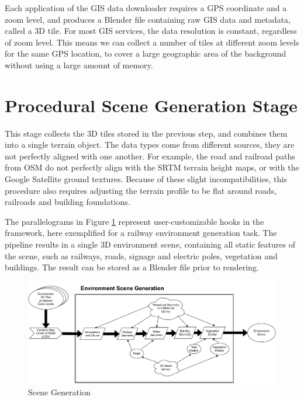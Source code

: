 Each application of the GIS data downloader requires a GPS coordinate and a zoom level, and produces a Blender file containing raw GIS data and metadata, called a 3D tile. For most GIS services, the data resolution is constant, regardless of zoom level. This means we can collect a number of tiles at different zoom levels for the same GPS location, to cover a large geographic area of the background without using a large amount of memory.


\section{Procedural Scene Generation Stage}
\label{sec:scene-generation-stage}

This stage collects the 3D tiles stored in the previous step, and combines them into a single terrain object. The data types come from different sources, they are not perfectly aligned with one another. For example, the road and railroad paths from OSM do not perfectly align with the SRTM terrain height maps, or with the Google Satellite ground textures. Because of these slight incompatibilities, this procedure also requires adjusting the terrain profile to be flat around roads, railroads and building foundations.

The parallelograms in Figure \ref{fig:design-scene-generation} represent user-customizable hooks in the framework, here exemplified for a  railway environment generation task. The pipeline results in a single 3D environment scene, containing all static features of the scene, such as railways, roads, signage and electric poles, vegetation and buildings. The result can be stored as a Blender file prior to rendering.

\begin{figure}[H]
    \centering
    \includegraphics[width=14.5cm]{src/img/fig/fig-3 environment scene generation.drawio.pdf}
    \caption{Scene Generation}
    \label{fig:design-scene-generation}
\end{figure}


